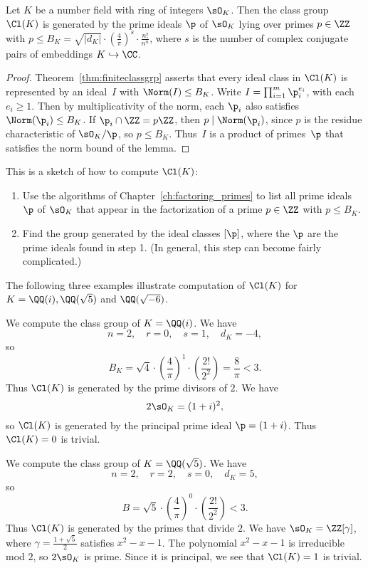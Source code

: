 \begin{lemma}
	Let $K$ be a number field with ring of integers $\sO_K$.  Then the
	class group $\Cl(K)$ is generated by the prime ideals $\p$ of $\sO_K$
	lying over primes $p\in\ZZ$ with $p\leq B_K = \sqrt{|d_K|}\cdot
	\left(\frac{4}{\pi}\right)^s\cdot \frac{n!}{n^n}$,
	where $s$ is the number of complex conjugate pairs of embeddings
	$K \hookrightarrow \CC$.
\end{lemma}
\begin{proof}
	Theorem~\ref{thm:finiteclassgrp}
	asserts that every ideal class in $\Cl(K)$ is represented by
	an ideal~$I$ with $\Norm(I)\leq B_K$.  Write $I=\prod_{i=1}^m
	\p_i^{e_i}$, with each $e_i\geq 1$.  Then by multiplicativity of the
	norm, each $\p_i$ also satisfies $\Norm(\p_i)\leq B_K$.  If $\p_i \cap
	\ZZ = p\ZZ$, then $p\mid \Norm(\p_i)$, since $p$ is the residue
	characteristic of $\sO_K/\p$, so $p\leq B_K$. Thus~$I$ is a product of
	primes~$\p$ that satisfies the norm bound of the lemma.
\end{proof}

This is a sketch of how to compute $\Cl(K)$:
\begin{enumerate}
	\item Use the algorithms of Chapter~\ref{ch:factoring_primes} to list all
	prime ideals $\p$ of $\sO_K$ that appear in the factorization
	of a prime $p\in \ZZ$ with $p\leq B_K$.
	\item Find the group generated  by the ideal
	classes $[\p]$, where the $\p$ are the prime ideals
	found in step 1.  (In general, this step can become
	fairly complicated.)
\end{enumerate}
The following three examples illustrate computation of $\Cl(K)$
for $K=\QQ(i), \QQ(\sqrt{5})$ and $\QQ(\sqrt{-6})$.
\begin{example}
	We compute the class group of $K=\QQ(i)$.  We have
	$$
	n = 2, \quad r=0, \quad s=1, \quad d_K = -4,
	$$
	so
	$$
	B_K = \sqrt{4}\cdot \left(\frac{4}{\pi}\right)^1
	\cdot\left(\frac{2!}{2^2}\right) = \frac{8}{\pi} <3.
	$$
	Thus $\Cl(K)$ is generated by the prime divisors
	of $2$.  We have
	$$
	2\sO_K = (1+i)^2,
	$$
	so $\Cl(K)$ is generated by the principal prime
	ideal $\p=(1+i)$. Thus $\Cl(K)=0$ is trivial.
\end{example}

\begin{example}
	We compute the class group of $K=\QQ(\sqrt{5})$.
	We have
	$$
	n = 2, \quad r = 2, \quad s=0, \quad d_K = 5,
	$$
	so
	$$
	B = \sqrt{5}\cdot \left(\frac{4}{\pi}\right)^0
	\cdot \left(\frac{2!}{2^2}\right) < 3.
	$$
	Thus $\Cl(K)$ is generated by the primes that divide $2$.
	We have $\sO_K=\ZZ[\gamma]$, where $\gamma=\frac{1+\sqrt{5}}{2}$
	satisfies $x^2-x-1$.   The polynomial $x^2-x-1$ is irreducible
	mod $2$, so $2\sO_K$ is prime.  Since it is principal, we see
	that $\Cl(K)=1$ is trivial.
\end{example}

